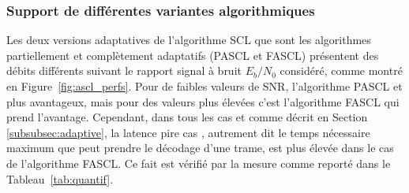   \begin{table}[t]
    \renewcommand{\arraystretch}{1.1}
    \centering
    \caption{Comparaison de débits et latences des algotihmes SCL adaptatifs pour des représentations en virgule flottante (32 bits) et virgule fixe (16 et 8 bits). Code polaire ($2048$,$1723$), $L=32$, CRC $c=32$ (GZip)}
    \label{tab:quantif}
    {\small{}}
  \end{table}

\subsubsection{Support de différentes variantes algorithmiques}
Les deux versions adaptatives de l'algorithme SCL que sont les algorithmes partiellement et complètement adaptatifs (PASCL et FASCL) présentent des débits différents suivant le rapport signal à bruit $E_b/N_0$ considéré, comme montré en Figure~\ref{fig:ascl_perfs}. Pour de faibles valeurs de SNR, l'algorithme PASCL et plus avantageux, mais pour des valeurs plus élevées c'est l'algorithme FASCL qui prend l'avantage. Cependant, dans tous les cas et comme décrit en Section \ref{subsubsec:adaptive}, la latence \og pire cas \fg, autrement dit le temps nécessaire maximum que peut prendre le décodage d'une trame, est plus élevée dans le cas de l'algorithme FASCL. Ce fait est vérifié par la mesure comme reporté dans le Tableau~\ref{tab:quantif}.

